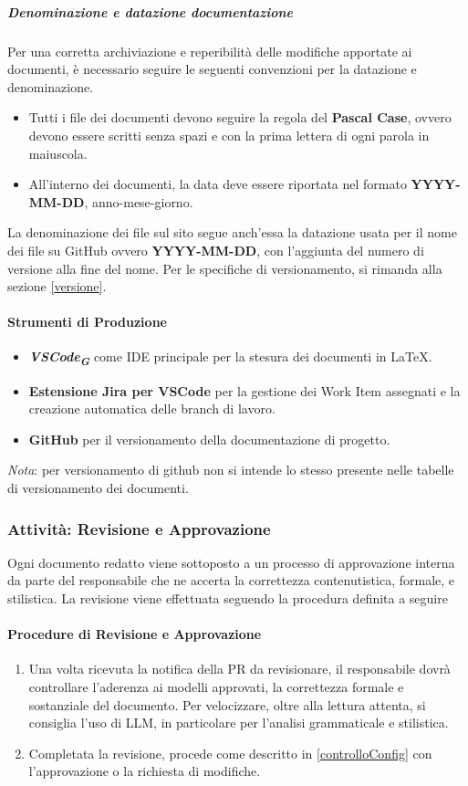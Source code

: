 \documentclass[a4paper,12pt]{article}
\newcommand{\glossario}[1]{\textit{#1}\textsubscript{\textbf{\textit{\textcolor{lightblack}{G}}}}}
\begin{document}
\subparagraph{Denominazione e datazione documentazione}\label{convenzioniNomiDate}
Per una corretta archiviazione e reperibilità delle modifiche apportate ai documenti, è necessario
seguire le seguenti convenzioni per la datazione e denominazione.
\begin{itemize}
    \item Tutti i file dei documenti devono seguire la regola del \textbf{Pascal Case}, ovvero
devono essere scritti senza spazi e con la prima lettera di ogni parola in
maiuscola.
\item All'interno dei documenti, la data deve essere riportata nel formato \textbf{YYYY-MM-DD}, anno-mese-giorno.
\end{itemize}
La denominazione dei file sul sito segue anch'essa la datazione usata per il nome dei file su GitHub ovvero \textbf{YYYY-MM-DD}, con l'aggiunta del numero di versione alla fine del nome. Per le specifiche di versionamento, si rimanda alla sezione \ref{versione}.

\paragraph{Strumenti di Produzione}
\begin{itemize}
    \item \glossario{\textbf{VSCode}} come IDE principale per la stesura dei documenti in \LaTeX.
    \item \textbf{Estensione Jira per VSCode} per la gestione dei Work Item assegnati e la creazione automatica delle branch di lavoro.
    \item \textbf{GitHub} per il versionamento della documentazione di progetto.
\end{itemize}
\textit{Nota}: per versionamento di github non si intende lo stesso presente nelle tabelle di versionamento dei documenti.

\subsubsection{Attività: Revisione e Approvazione} \label{revisione_approvazione}
Ogni documento redatto viene sottoposto a un processo di approvazione interna da parte del responsabile che
ne accerta la correttezza contenutistica, formale, e stilistica. La revisione viene effettuata seguendo la procedura definita a seguire
\paragraph{Procedure di Revisione e Approvazione}\label{procedureRevisioneDocs}
\begin{enumerate}
    \item Una volta ricevuta la notifica della PR da revisionare, il responsabile dovrà
          controllare l'aderenza ai modelli approvati, la correttezza formale e
          sostanziale del documento. Per velocizzare, oltre alla lettura attenta, si
          consiglia l'uso di LLM, in particolare per l'analisi grammaticale e stilistica.
    \item Completata la revisione, procede come descritto in \ref{controlloConfig} con l'approvazione o la richiesta di modifiche.
\end{enumerate}
\end{document}

